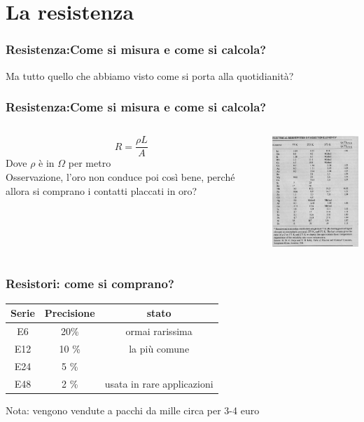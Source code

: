 	\section{La resistenza} %
	\label{sec:la_resistenza}
		\begin{frame}[c]\frametitle{Resistenza:Come si misura e come si calcola?}
		    Ma tutto quello che abbiamo visto come si porta alla quotidianità?			
		\end{frame}
		\begin{frame}[c]\frametitle{Resistenza:Come si misura e come si calcola?}
		    \begin{columns}
		    	\begin{column}{0.5\textwidth}
		    		\[
		    		 R = \frac{\rho L}{A}
		    		\]
		    		Dove $\rho$ è in $\Omega$ per metro\\
		    		Osservazione, l'oro non conduce poi così bene, perché allora si comprano i contatti placcati in oro?		    		
		    	\end{column}
		    	\begin{column}{0.7\textwidth}
		    		\includegraphics[width=5.5cm]{./img/rho.jpg}
		    	\end{column}
		    \end{columns}	
		\end{frame}

		\begin{frame}[c]\frametitle{Resistori: come si comprano?}
		    \centering
		\begin{tabular}{c|c|c}
		Serie & Precisione & stato \\
		\hline
		E6	& 20\% & ormai rarissima  \\
		E12	& 10 \% & la più comune  \\
		E24	& 5  \% \\
		E48	& 2  \% & usata in rare applicazioni \\
		\end{tabular}
		
		\bigskip
		
		Nota: vengono vendute a pacchi da mille circa per 3-4 euro
		
		\end{frame}

